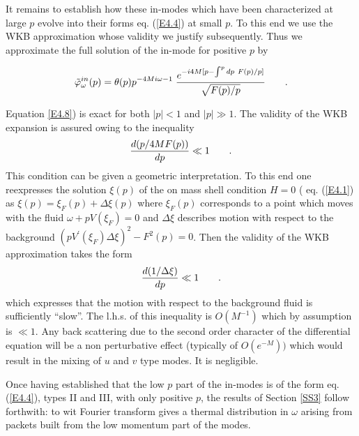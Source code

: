 \documentclass[12pt]{article}
\begin{document}
It remains to establish how
these in-modes which have been characterized at large $p$ evolve into their
forms  eq. (\ref {E4.4}) at small $p$.
To this end we use the WKB approximation whose validity we justify subsequently.
Thus we approximate the full solution of the in-mode for positive $p$ by

\begin{equation}
\label{E4.8}
\tilde \varphi_\omega^{in} (p) = \theta (p)  p^{- 4 M i \omega
-1} \; {e^{-i 4
M  [ p - \int^p d p \ F (p)  / p ]} \over \sqrt { F (p)  /
 p }} \qquad .
\end{equation}




\noindent Equation \ref{E4.8}) is exact for both $\vert  p \vert < 1$ and $
\vert  p \vert \gg 1$.
The validity of the WKB expansion is assured owing to the inequality 
\begin{equation} 
{ d(p/4M F(p)) \over dp }
 \ll
1 \qquad .
\label{E4.8aa}\end{equation}
This condition can be given a geometric interpretation. To this end
one reexpresses the solution $\xi(p)$ of the on mass shell condition
$H=0$ ( eq. (\ref{E4.1}) as $\xi(p) = \xi_F (p) + \Delta \xi(p)$ where
$\xi_F(p)$ corresponds to a point which moves with the fluid $\omega +
p V(\xi_F) =0$ and $\Delta \xi$ describes motion with respect to the
background $(p V^\prime (\xi_F) \Delta \xi )^2 - F^2(p)=0$. Then the
validity of the WKB approximation takes the form
\begin{equation} 
{d(1/\Delta \xi)\over dp}
 \ll
1 \qquad .
\label{E4.8b}\end{equation}
which expresses that the motion with respect to the background fluid
is sufficiently ``slow''.
The l.h.s. of this inequality is $O (M^{-1})$ which by assumption is $
\ll 1.$ Any back scattering due to the second order character of the
differential equation will be a non perturbative effect (typically of $
O (e^{-M}))$ which would result in the mixing of $u$ and $v$ type
modes. It is negligible.



Once having established that the low $p$ part of the in-modes is of the form
 eq. (\ref{E4.4}), types II and III, with only positive $p$, the
results of Section \ref{SS3} follow forthwith: to wit Fourier transform gives a
thermal distribution in $ \omega$ arising from packets built from the low
momentum part of the modes.
\end{document}
